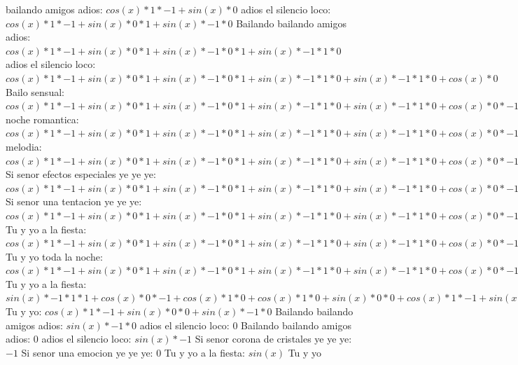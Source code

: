 \documentclass{article}
\begin{document}
bailando amigos adios: $cos(x)*1*-1+sin(x)*0$ adios el silencio loco: ${cos(x)*1*-1+sin(x)*0}*1+sin(x)*-1*0$ Bailando bailando amigos adios: ${{cos(x)*1*-1+sin(x)*0}*1+sin(x)*-1*0}*1+sin(x)*-1*1*0$ adios el silencio loco: ${{cos(x)*1*-1+sin(x)*0}*1+sin(x)*-1*0}*1+sin(x)*-1*1*0+sin(x)*-1*1*0+cos(x)*0$ Bailo sensual: ${{{cos(x)*1*-1+sin(x)*0}*1+sin(x)*-1*0}*1+sin(x)*-1*1*0+sin(x)*-1*1*0+cos(x)*0}*-1+{sin(x)*-1*1*1+cos(x)*0}*0$ noche romantica: ${{{cos(x)*1*-1+sin(x)*0}*1+sin(x)*-1*0}*1+sin(x)*-1*1*0+sin(x)*-1*1*0+cos(x)*0}*-1+{sin(x)*-1*1*1+cos(x)*0}*0+{sin(x)*-1*1*1+cos(x)*0}*0+cos(x)*1*0$ melodia: ${{{cos(x)*1*-1+sin(x)*0}*1+sin(x)*-1*0}*1+sin(x)*-1*1*0+sin(x)*-1*1*0+cos(x)*0}*-1+{sin(x)*-1*1*1+cos(x)*0}*0+{sin(x)*-1*1*1+cos(x)*0}*0+cos(x)*1*0+{sin(x)*-1*1*1+cos(x)*0}*0+cos(x)*1*0+cos(x)*1*0+sin(x)*0$ Si senor efectos especiales ye ye ye: ${{{{cos(x)*1*-1+sin(x)*0}*1+sin(x)*-1*0}*1+sin(x)*-1*1*0+sin(x)*-1*1*0+cos(x)*0}*-1+{sin(x)*-1*1*1+cos(x)*0}*0+{sin(x)*-1*1*1+cos(x)*0}*0+cos(x)*1*0+{sin(x)*-1*1*1+cos(x)*0}*0+cos(x)*1*0+cos(x)*1*0+sin(x)*0}*1+{{sin(x)*-1*1*1+cos(x)*0}*-1+cos(x)*1*0+cos(x)*1*0+sin(x)*0}*0$ Si senor una tentacion ye ye ye: ${{{{cos(x)*1*-1+sin(x)*0}*1+sin(x)*-1*0}*1+sin(x)*-1*1*0+sin(x)*-1*1*0+cos(x)*0}*-1+{sin(x)*-1*1*1+cos(x)*0}*0+{sin(x)*-1*1*1+cos(x)*0}*0+cos(x)*1*0+{sin(x)*-1*1*1+cos(x)*0}*0+cos(x)*1*0+cos(x)*1*0+sin(x)*0}*1+{{sin(x)*-1*1*1+cos(x)*0}*-1+cos(x)*1*0+cos(x)*1*0+sin(x)*0}*0+{{sin(x)*-1*1*1+cos(x)*0}*-1+cos(x)*1*0+cos(x)*1*0+sin(x)*0}*0+{cos(x)*1*-1+sin(x)*0}*0$ Tu y yo a la fiesta: ${{{{cos(x)*1*-1+sin(x)*0}*1+sin(x)*-1*0}*1+sin(x)*-1*1*0+sin(x)*-1*1*0+cos(x)*0}*-1+{sin(x)*-1*1*1+cos(x)*0}*0+{sin(x)*-1*1*1+cos(x)*0}*0+cos(x)*1*0+{sin(x)*-1*1*1+cos(x)*0}*0+cos(x)*1*0+cos(x)*1*0+sin(x)*0}*1+{{sin(x)*-1*1*1+cos(x)*0}*-1+cos(x)*1*0+cos(x)*1*0+sin(x)*0}*0+{{sin(x)*-1*1*1+cos(x)*0}*-1+cos(x)*1*0+cos(x)*1*0+sin(x)*0}*0+{cos(x)*1*-1+sin(x)*0}*0+{{sin(x)*-1*1*1+cos(x)*0}*-1+cos(x)*1*0+cos(x)*1*0+sin(x)*0}*0+{cos(x)*1*-1+sin(x)*0}*0+{cos(x)*1*-1+sin(x)*0}*0+sin(x)*-1*0$ Tu y yo toda la noche: ${{{{cos(x)*1*-1+sin(x)*0}*1+sin(x)*-1*0}*1+sin(x)*-1*1*0+sin(x)*-1*1*0+cos(x)*0}*-1+{sin(x)*-1*1*1+cos(x)*0}*0+{sin(x)*-1*1*1+cos(x)*0}*0+cos(x)*1*0+{sin(x)*-1*1*1+cos(x)*0}*0+cos(x)*1*0+cos(x)*1*0+sin(x)*0}*1+{{sin(x)*-1*1*1+cos(x)*0}*-1+cos(x)*1*0+cos(x)*1*0+sin(x)*0}*0+{{sin(x)*-1*1*1+cos(x)*0}*-1+cos(x)*1*0+cos(x)*1*0+sin(x)*0}*0+{cos(x)*1*-1+sin(x)*0}*0+{{sin(x)*-1*1*1+cos(x)*0}*-1+cos(x)*1*0+cos(x)*1*0+sin(x)*0}*0+{cos(x)*1*-1+sin(x)*0}*0+{cos(x)*1*-1+sin(x)*0}*0+sin(x)*-1*0$  \newline Tu y yo a la fiesta: ${{sin(x)*-1*1*1+cos(x)*0}*-1+cos(x)*1*0+cos(x)*1*0+sin(x)*0}*0+{cos(x)*1*-1+sin(x)*0}*0+{cos(x)*1*-1+sin(x)*0}*0+sin(x)*-1*0$  \newline Tu y yo: ${cos(x)*1*-1+sin(x)*0}*0+sin(x)*-1*0$  \newline Bailando bailando amigos adios: $sin(x)*-1*0$ adios el silencio loco: $0$ Bailando bailando amigos adios: $0$  \newline adios el silencio loco: $sin(x)*-1$ Si senor corona de cristales ye ye ye: $-1$ Si senor una emocion ye ye ye: $0$  \newline Tu y yo a la fiesta: $sin(x)$  \newline Tu y yo 
\end{document}
